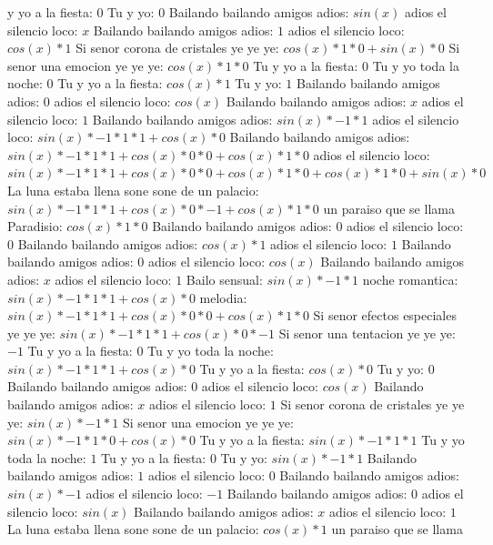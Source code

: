 \documentclass{article}
\begin{document}
y yo a la fiesta: $0$ Tu y yo: $0$  \newline Bailando bailando amigos adios: $sin(x)$  \newline adios el silencio loco: $x$ Bailando bailando amigos adios: $1$  \newline adios el silencio loco: $cos(x)*1$ Si senor corona de cristales ye ye ye: $cos(x)*1*0+sin(x)*0$ Si senor una emocion ye ye ye: $cos(x)*1*0$ Tu y yo a la fiesta: $0$ Tu y yo toda la noche: $0$  \newline Tu y yo a la fiesta: $cos(x)*1$ Tu y yo: $1$ Bailando bailando amigos adios: $0$  \newline adios el silencio loco: $cos(x)$  \newline Bailando bailando amigos adios: $x$ adios el silencio loco: $1$  \newline Bailando bailando amigos adios: $sin(x)*-1*1$ adios el silencio loco: $sin(x)*-1*1*1+cos(x)*0$ Bailando bailando amigos adios: ${sin(x)*-1*1*1+cos(x)*0}*0+cos(x)*1*0$ adios el silencio loco: ${sin(x)*-1*1*1+cos(x)*0}*0+cos(x)*1*0+cos(x)*1*0+sin(x)*0$ La luna estaba llena sone sone de un palacio: ${sin(x)*-1*1*1+cos(x)*0}*-1+cos(x)*1*0$  \newline un paraiso que se llama Paradisio: $cos(x)*1*0$ Bailando bailando amigos adios: $0$ adios el silencio loco: $0$  \newline Bailando bailando amigos adios: $cos(x)*1$ adios el silencio loco: $1$ Bailando bailando amigos adios: $0$  \newline adios el silencio loco: $cos(x)$  \newline Bailando bailando amigos adios: $x$ adios el silencio loco: $1$  \newline Bailo sensual: $sin(x)*-1*1$ noche romantica: $sin(x)*-1*1*1+cos(x)*0$ melodia: ${sin(x)*-1*1*1+cos(x)*0}*0+cos(x)*1*0$ Si senor efectos especiales ye ye ye: ${sin(x)*-1*1*1+cos(x)*0}*-1$ Si senor una tentacion ye ye ye: $-1$ Tu y yo a la fiesta: $0$  \newline Tu y yo toda la noche: $sin(x)*-1*1*1+cos(x)*0$  \newline Tu y yo a la fiesta: $cos(x)*0$ Tu y yo: $0$ Bailando bailando amigos adios: $0$  \newline adios el silencio loco: $cos(x)$  \newline Bailando bailando amigos adios: $x$ adios el silencio loco: $1$  \newline Si senor corona de cristales ye ye ye: $sin(x)*-1*1$ Si senor una emocion ye ye ye: $sin(x)*-1*1*0+cos(x)*0$ Tu y yo a la fiesta: $sin(x)*-1*1*1$ Tu y yo toda la noche: $1$ Tu y yo a la fiesta: $0$  \newline Tu y yo: $sin(x)*-1*1$ Bailando bailando amigos adios: $1$ adios el silencio loco: $0$  \newline Bailando bailando amigos adios: $sin(x)*-1$ adios el silencio loco: $-1$ Bailando bailando amigos adios: $0$  \newline adios el silencio loco: $sin(x)$  \newline Bailando bailando amigos adios: $x$ adios el silencio loco: $1$  \newline La luna estaba llena sone sone de un palacio: $cos(x)*1$ un paraiso que se llama 
\end{document}
